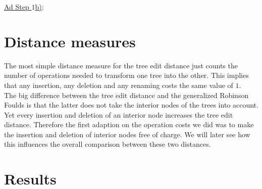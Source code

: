 \underline{Ad Step $1$b)}:\\

\section{Distance measures}
The most simple distance measure for the tree edit distance just counts the number of operations needed to transform one tree into the other. This implies that any insertion, any deletion and any renaming costs the same value of $1$. \\
The big difference between the tree edit distance and the generalized Robinson Foulds is that the latter does not take the interior nodes of the trees into account. Yet every insertion and deletion of an interior node increases the tree edit distance. Therefore the first adaption on the operation costs we did was to make the insertion and deletion of interior nodes free of charge. We will later see how this influences the overall comparison between these two distances.

\section{Results}
